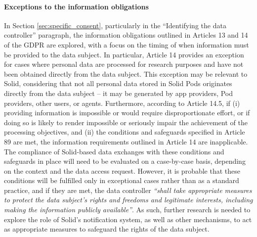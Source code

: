 \paragraph{Exceptions to the information obligations}
In Section \ref{sec:specific_consent}, particularly in the ``Identifying the data controller'' paragraph, the information obligations outlined in Articles 13 and 14 of the GDPR \citeyearpar{noauthor_regulation_2016} are explored, with a focus on the timing of when information must be provided to the data subject.
In particular, Article 14 provides an exception for cases where personal data are processed for research purposes and have not been obtained directly from the data subject.
This exception may be relevant to Solid, considering that not all personal data stored in Solid Pods originates directly from the data subject -- it may be generated by app providers, Pod providers, other users, or agents.
Furthermore, according to Article 14.5, if (i) providing information is impossible or would require disproportionate effort, or if doing so is likely to render impossible or seriously impair the achievement of the processing objectives, and (ii) the conditions and safeguards specified in Article 89 \citeyearpar{noauthor_regulation_2016} are met, the information requirements outlined in Article 14 are inapplicable.
The compliance of Solid-based data exchanges with these conditions and safeguards in place will need to be evaluated on a case-by-case basis, depending on the context and the data access request.
However, it is probable that these conditions will be fulfilled only in exceptional cases rather than as a standard practice, and if they are met, the data controller \textit{``shall take appropriate measures to protect the data subject's rights and freedoms and legitimate interests, including making the information publicly available''}. 
As such, further research is needed to explore the role of Solid's notification system, as well as other mechanisms, to act as appropriate measures to safeguard the rights of the data subject.

